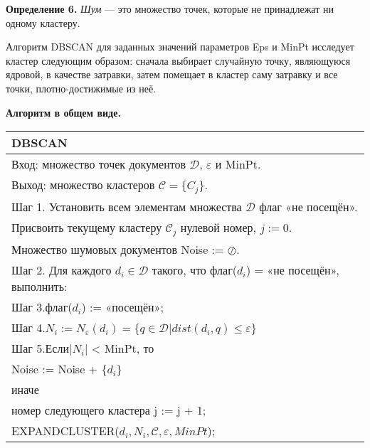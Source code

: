 \textbf{Определение 6.} \emph{Шум} --- это множество точек, которые не принадлежат ни одному кластеру.

Алгоритм DBSCAN для заданных значений параметров Eps и MinPt исследует кластер следующим образом: сначала выбирает случайную точку, являющуюся ядровой, в качестве затравки, затем помещает в кластер саму затравку и все точки, плотно-достижимые из неё.

\textbf{Алгоритм в общем виде.}

\begin{table}[h!]
	\begin{threeparttable}
		\captionsetup{justification=raggedleft,singlelinecheck=off}
		\begin{tabular}{l}
			\hline
			DBSCAN \\
			\hline
			Вход: множество точек документов \(\mathcal{D}\), \(\varepsilon\) и MinPt. \\
			Выход: множество кластеров \(\mathcal{C} = \{C_j\}\).\\
			Шаг 1. Установить всем элементам множества \(\mathcal{D}\) флаг «не посещён». \\
			\quad Присвоить текущему кластеру \(\mathcal{C}_j\) нулевой номер, \(j := 0\). \\
			\quad Множество шумовых документов Noise := \(\oslash\).\\
			Шаг 2. Для каждого \(d_i \in \mathcal{D}\) такого, что флаг(\(d_i\)) = «не посещён», выполнить: \\
			Шаг 3.\quad флаг(\(d_i\)) := «посещён»; \\
			Шаг 4.\quad \(N_i := N_{\varepsilon}(d_i) = \{q \in \mathcal{D} | dist(d_i,q) \le \varepsilon\}\) \\
			Шаг 5.\quad Если|\(N_i\)| < MinPt, то  \\
			\quad\quad\quad\quad\quad\quad Noise := Noise + \(\{d_i\}\) \\
			\quad\quad\quad\quad иначе \\
			\quad\quad\quad\quad\quad\quad номер следующего кластера j := j + 1;  \\
			\quad\quad\quad\quad\quad\quad EXPANDCLUSTER(\(d_i, N_i, \mathcal{C}, \varepsilon, MinPt\)); \\
			\hline
		\end{tabular}
	\end{threeparttable}
\end{table}

